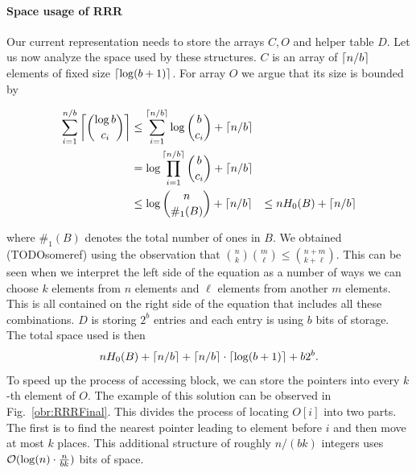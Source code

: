 \paragraph{Space usage of RRR}

Our current representation needs to store the arrays $C, O$ and helper table $D$. Let us now
analyze the space used by these structures. $C$ is an array of $\left\lceil n/b \right\rceil$ elements of fixed size
$\left\lceil \log(b+1) \right\rceil$. For array $O$ we argue that its size is bounded by

\begin{align*}
    \sum_{i=1}^{n/b} \left\lceil {\log b\choose c_i} \right\rceil
    &\leq \sum_{i=1}^{\left\lceil n/b \right\rceil} \log {b\choose c_i} + \left\lceil n/b \right\rceil \\
    &= \log\prod_{i=1}^{\left\lceil n/b \right\rceil} {b\choose c_i} + \left\lceil n/b \right\rceil \\
    &\leq \log{n\choose \#_1(B)} + \left\lceil n/b \right\rceil &\leq nH_0(B) + \left\lceil n/b \right\rceil
\end{align*}

where $\#_1(B)$ denotes the total number of ones in $B$. We obtained (TODOsomeref) using the
observation that ${n\choose k} {m\choose \ell} \leq {n+m\choose k+\ell}$. This can be seen
when we interpret the left side of the equation as a number of ways we can choose $k$ elements
from $n$ elements and $\ell$ elements from another $m$ elements. This is all contained on the
right side of the equation that includes all these combinations. $D$ is storing $2^b$ entries
and each entry is using $b$ bits of storage. The total space used is then
$$nH_0(B) + \left\lceil n/b \right\rceil + \left\lceil n/b \right\rceil \cdot \left\lceil \log(b+1) \right\rceil + b2^b.$$ To speed up the process
of accessing block, we can store the pointers into every $k$-th element of $O$. The example of
this solution can be observed in Fig.~\ref{obr:RRRFinal}. This divides the process of locating
$O[i]$ into two parts. The first is to find the nearest pointer leading to element before $i$
and then move at most $k$ places. This additional structure of roughly $n/(bk)$ integers uses
$\mathcal{O}(\log(n)\cdot \frac{n}{bk})$ bits of space.

